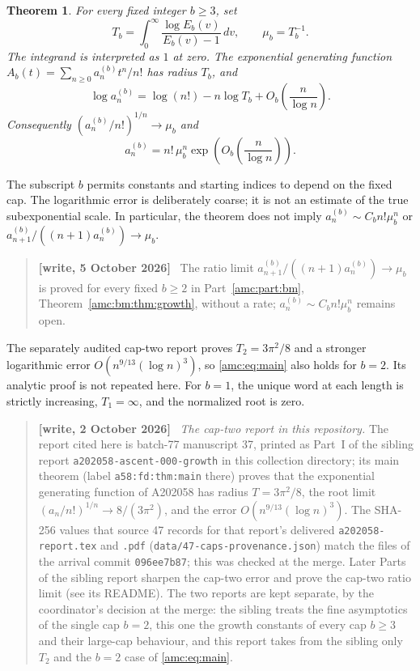 \documentclass[11pt,letterpaper]{article}
\newtheorem{theorem}{Theorem}[section]
\theoremstyle{remark}\newtheorem{remark}[theorem]{Remark}
\newenvironment{writenote}{\par\smallskip\begin{quote}\small\textbf{[write, 2 October 2026]}\ }{\end{quote}\smallskip}
\newenvironment{writenotedated}[1]{\par\smallskip\begin{quote}\small\textbf{[write, #1]}\ }{\end{quote}\smallskip}
\newcommand{\repopath}[1]{\nolinkurl{#1}}
\begin{document}
\begin{theorem}\label{amc:thm:fixed}
For every fixed integer $b\ge3$, set
\begin{equation}\label{amc:eq:Tb}
 T_b=\int_0^\infty\frac{\log E_b(v)}{E_b(v)-1}\,dv,
 \qquad \mu_b=T_b^{-1}.
\end{equation}
The integrand is interpreted as $1$ at zero. The exponential generating function
$A_b(t)=\sum_{n\ge0}a_n^{(b)}t^n/n!$ has radius $T_b$, and
\begin{equation}\label{amc:eq:main}
 \log a_n^{(b)}=\log(n!)-n\log T_b+O_b\!\left(\frac n{\log n}\right).
\end{equation}
Consequently $(a_n^{(b)}/n!)^{1/n}\to\mu_b$ and
\[
 a_n^{(b)}=n!\,\mu_b^n\exp\!\left(O_b\!\left(\frac n{\log n}\right)\right).
\]
\end{theorem}
The subscript $b$ permits constants and starting indices to depend on the fixed cap. The logarithmic error is deliberately coarse; it is not an estimate of the true subexponential scale. In particular, the theorem does not imply $a_n^{(b)}\sim C_bn!\mu_b^n$ or $a_{n+1}^{(b)}/((n+1)a_n^{(b)})\to\mu_b$.
\begin{writenotedated}{5 October 2026}
The ratio limit $a_{n+1}^{(b)}/((n+1)a_n^{(b)})\to\mu_b$ is proved for every fixed $b\ge2$ in Part~\ref{amc:part:bm}, Theorem~\ref{amc:bm:thm:growth}, without a rate; $a_n^{(b)}\sim C_bn!\mu_b^n$ remains open.
\end{writenotedated}

The separately audited cap-two report \cite{cap2report} proves $T_2=3\pi^2/8$ and a stronger logarithmic error $O(n^{9/13}(\log n)^3)$, so \eqref{amc:eq:main} also holds for $b=2$. Its analytic proof is not repeated here. For $b=1$, the unique word at each length is strictly increasing, $T_1=\infty$, and the normalized root is zero.
\begin{writenote}
\emph{The cap-two report in this repository.} The report cited here is batch-77 manuscript 37, printed as Part~I of the sibling report \repopath{a202058-ascent-000-growth} in this collection directory; its main theorem (label \texttt{a58:fd:thm:main} there) proves that the exponential generating function of A202058 has radius $T=3\pi^2/8$, the root limit $(a_n/n!)^{1/n}\to8/(3\pi^2)$, and the error $O(n^{9/13}(\log n)^3)$. The SHA-256 values that source 47 records for that report's delivered \texttt{a202058-report.tex} and \texttt{.pdf} (\repopath{data/47-caps-provenance.json}) match the files of the arrival commit \texttt{096ee7b87}; this was checked at the merge. Later Parts of the sibling report sharpen the cap-two error and prove the cap-two ratio limit (see its README). The two reports are kept separate, by the coordinator's decision at the merge: the sibling treats the fine asymptotics of the single cap $b=2$, this one the growth constants of every cap $b\ge3$ and their large-cap behaviour, and this report takes from the sibling only $T_2$ and the $b=2$ case of \eqref{amc:eq:main}.
\end{writenote}
\end{document}
